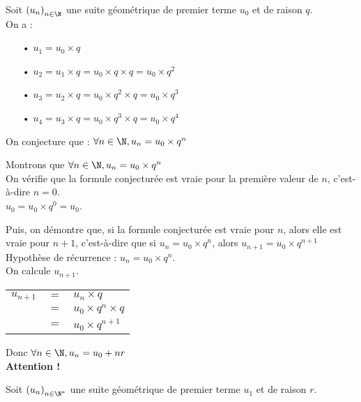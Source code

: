 Soit $\left(u_n\right)_{n \in \N}$ une suite géométrique de premier terme $u_0$ et de raison $q$. \\

On a :

\begin{itemize}
\item[•] $u_1 = u_0 \times q$
\item[•] $u_2 = u_1 \times q = u_0 \times q \times q = u_0 \times q^2$
\item[•] $u_3 = u_2 \times q = u_0 \times q^2 \times q = u_0 \times q^3$
\item[•] $u_4 = u_3 \times q = u_0 \times q^3 \times q = u_0 \times q^4$
\end{itemize}

\vspace*{.3cm}

On conjecture que : $\forall n \in \N, u_n = u_0 \times q^n$ \\

\newpage

Montrons que $\forall n \in \N, u_n = u_0 \times q^n$ \\

On vérifie que la formule conjecturée est vraie pour la première valeur de $n$, c'est-à-dire $n = 0$. \\

$u_0 = u_0 \times q^0 = u_0$. 

Puis, on démontre que, si la formule conjecturée est vraie pour $n$, alors elle est vraie pour $n+1$, c'est-à-dire que si $u_n = u_0 \times q^n$, alors $u_{n+1} = u_0 \times q^{n+1}$ \\

Hypothèse de récurrence : $u_n = u_0 \times q^n$. \\

On calcule $u_{n+1}$. \\

\begin{tabular}{lll}
$u_{n+1}$ & $ = $ & $u_n \times q$ \\
& $=$ & $u_0 \times q^n \times q$ \\
& $=$ & $u_0 \times q^{n+1}$ \\ 
\end{tabular}

Donc $\forall n \in \N, u_n = u_0 + nr$ \\

\textbf{Attention !}

Soit $\left(u_n\right)_{n \in \N^*}$ une suite géométrique de premier terme $u_1$ et de raison $r$. \\

